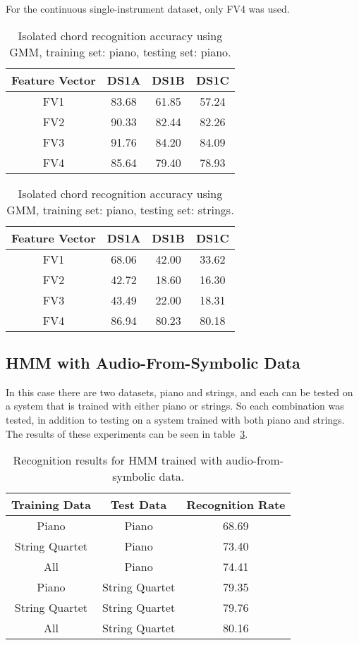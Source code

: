 \documentclass{sig-alternate}
\begin{document}
For the continuous single-instrument dataset, only FV4 was used.


\begin{table}
\centering
\begin{tabular}{|c|c|c|c|} \hline
Feature Vector & DS1A & DS1B & DS1C \\ \hline
FV1 & 83.68 & 61.85 & 57.24 \\ \hline
FV2 & 90.33 & 82.44 & 82.26 \\ \hline
FV3 & 91.76 & 84.20 & 84.09 \\ \hline
FV4 & 85.64 & 79.40 & 78.93 \\ \hline
\end{tabular}
\caption{Isolated chord recognition accuracy using GMM, training set: piano, testing set: piano.}
\label{tab:tab3}
\end{table} 

\begin{table}
\centering
\begin{tabular}{|c|c|c|c|} \hline
Feature Vector & DS1A & DS1B & DS1C \\ \hline
FV1 & 68.06 & 42.00 & 33.62 \\ \hline
FV2 & 42.72 & 18.60 & 16.30 \\ \hline
FV3 & 43.49 & 22.00 & 18.31 \\ \hline
FV4 & 86.94 & 80.23 & 80.18 \\ \hline
\end{tabular}
\caption{Isolated chord recognition accuracy using GMM, training set: piano, testing set: strings.}
\label{tab:tab4}
\end{table}

\subsection{HMM with Audio-From-Symbolic Data}

In this case there are two datasets, piano and strings, and each can be tested on a system that is trained with either piano or strings. So each combination was tested, in addition to testing on a system trained with both piano and strings. The results of these experiments can be seen in table~\ref{tab:tab5}.

\begin{table}
\centering
\begin{tabular}{|c|c|c|} \hline
Training Data & Test Data & Recognition Rate \\ \hline
Piano & Piano & 68.69 \\ \hline
String Quartet & Piano & 73.40 \\ \hline
All & Piano & 74.41 \\ \hline
Piano & String Quartet & 79.35 \\ \hline
String Quartet & String Quartet & 79.76 \\ \hline
All & String Quartet & 80.16 \\ \hline
\end{tabular}
\caption{Recognition results for HMM trained with audio-from-symbolic data.}
\label{tab:tab5}
\end{table}
\end{document}

